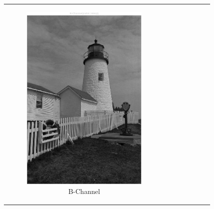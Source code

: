 \documentclass[11pt, a4]{article}
\begin{document}
\begin{enumerate}
\begin{enumerate}
\begin{figure}[h]
{\begin{tabular}{cc}
\begin{subfigure}[h]{0.45\linewidth}
						\includegraphics[width=\linewidth]{../output/2_B-channel_cubic.pdf}
						\caption{B-Channel}
						\label{fig:problem1_part2_B_cubic}
					\end{subfigure} &
					\begin{subfigure}[h]{0.45\linewidth}
						\centering

\end{subfigure}
\end{tabular}}
\end{figure}
\end{enumerate}
\end{enumerate}
\end{document}
